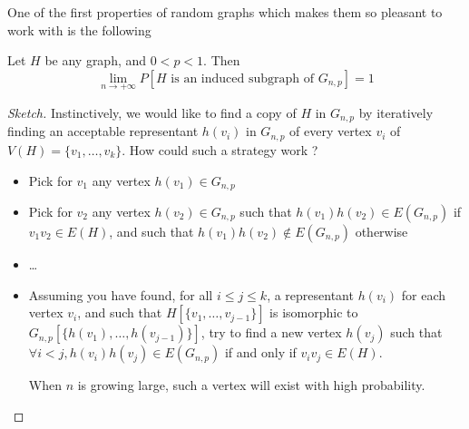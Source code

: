One of the first properties of random graphs which makes them so pleasant to work with is the following

\begin{theorem}
  Let $H$ be any graph, and $0<p<1$. Then
$$\lim_{n\to +\infty}P\left[H\text{ is an induced subgraph of }G_{n,p}\right]=1$$
\end{theorem}
\begin{proof}[Sketch]
Instinctively, we would like to find a copy of $H$ in $G_{n,p}$ by iteratively finding an acceptable representant $h(v_i)$ in $G_{n,p}$ of every vertex $v_i$ of $V(H) = \{v_1, \dots, v_k\}$. How could such a strategy work ?
\begin{itemize}
\item Pick for $v_1$ any vertex $h(v_1)\in G_{n,p}$
\item Pick for $v_2$ any vertex $h(v_2)\in G_{n,p}$ such that $h(v_1)h(v_2)\in E(G_{n,p})$ if $v_1v_2\in E(H)$, and such that $h(v_1)h(v_2)\not \in E(G_{n,p})$ otherwise
\item \dots
\item Assuming you have found, for all $i\leq j\leq k$, a representant $h(v_i)$ for each vertex $v_i$, and such that $H[\{v_1,\dots,v_{j-1}\}]$ is isomorphic to $G_{n,p}[\{h(v_1),\dots,h(v_{j-1})\}]$, try to find a new vertex $h(v_j)$ such that $\forall i<j,h(v_i)h(v_j)\in E(G_{n,p})$ if  and only if $v_iv_j\in E(H)$.

  When $n$ is growing large, such a vertex will exist with high probability.
\end{itemize}
\end{proof}

